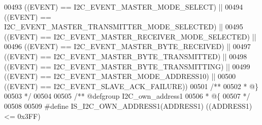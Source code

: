 \begin{DoxyCode}
00493                              \textcolor{preprocessor}{(}\textcolor{preprocessor}{(}\textcolor{preprocessor}{EVENT}\textcolor{preprocessor}{)} \textcolor{preprocessor}{==} I2C_EVENT_MASTER_MODE_SELECT\textcolor{preprocessor}{)} \textcolor{preprocessor}{||}
00494                              \textcolor{preprocessor}{(}\textcolor{preprocessor}{(}\textcolor{preprocessor}{EVENT}\textcolor{preprocessor}{)} \textcolor{preprocessor}{==} 
      I2C_EVENT_MASTER_TRANSMITTER_MODE_SELECTED\textcolor{preprocessor}{)} \textcolor{preprocessor}{||}
00495                              \textcolor{preprocessor}{(}\textcolor{preprocessor}{(}\textcolor{preprocessor}{EVENT}\textcolor{preprocessor}{)} \textcolor{preprocessor}{==} 
      I2C_EVENT_MASTER_RECEIVER_MODE_SELECTED\textcolor{preprocessor}{)} \textcolor{preprocessor}{||}
00496                              \textcolor{preprocessor}{(}\textcolor{preprocessor}{(}\textcolor{preprocessor}{EVENT}\textcolor{preprocessor}{)} \textcolor{preprocessor}{==} I2C_EVENT_MASTER_BYTE_RECEIVED\textcolor{preprocessor}{)} \textcolor{preprocessor}{||}
00497                              \textcolor{preprocessor}{(}\textcolor{preprocessor}{(}\textcolor{preprocessor}{EVENT}\textcolor{preprocessor}{)} \textcolor{preprocessor}{==} I2C_EVENT_MASTER_BYTE_TRANSMITTED\textcolor{preprocessor}{)} \textcolor{preprocessor}{||}
00498                              \textcolor{preprocessor}{(}\textcolor{preprocessor}{(}\textcolor{preprocessor}{EVENT}\textcolor{preprocessor}{)} \textcolor{preprocessor}{==} I2C_EVENT_MASTER_BYTE_TRANSMITTING\textcolor{preprocessor}{)} \textcolor{preprocessor}{||}
00499                              \textcolor{preprocessor}{(}\textcolor{preprocessor}{(}\textcolor{preprocessor}{EVENT}\textcolor{preprocessor}{)} \textcolor{preprocessor}{==} I2C_EVENT_MASTER_MODE_ADDRESS10\textcolor{preprocessor}{)} \textcolor{preprocessor}{||}
00500                              \textcolor{preprocessor}{(}\textcolor{preprocessor}{(}\textcolor{preprocessor}{EVENT}\textcolor{preprocessor}{)} \textcolor{preprocessor}{==} I2C_EVENT_SLAVE_ACK_FAILURE\textcolor{preprocessor}{)}\textcolor{preprocessor}{)}
00501 \textcolor{comment}{/**}
00502 \textcolor{comment}{  * @\}}
00503 \textcolor{comment}{  */}
00504 
00505 \textcolor{comment}{/** @defgroup I2C\_own\_address1 }
00506 \textcolor{comment}{  * @\{}
00507 \textcolor{comment}{  */}
00508 
00509 \textcolor{preprocessor}{#}\textcolor{preprocessor}{define} \textcolor{preprocessor}{IS\_I2C\_OWN\_ADDRESS1}\textcolor{preprocessor}{(}\textcolor{preprocessor}{ADDRESS1}\textcolor{preprocessor}{)} \textcolor{preprocessor}{(}\textcolor{preprocessor}{(}\textcolor{preprocessor}{ADDRESS1}\textcolor{preprocessor}{)} \textcolor{preprocessor}{<=} 0x3FF\textcolor{preprocessor}{)}

\end{DoxyCode}
